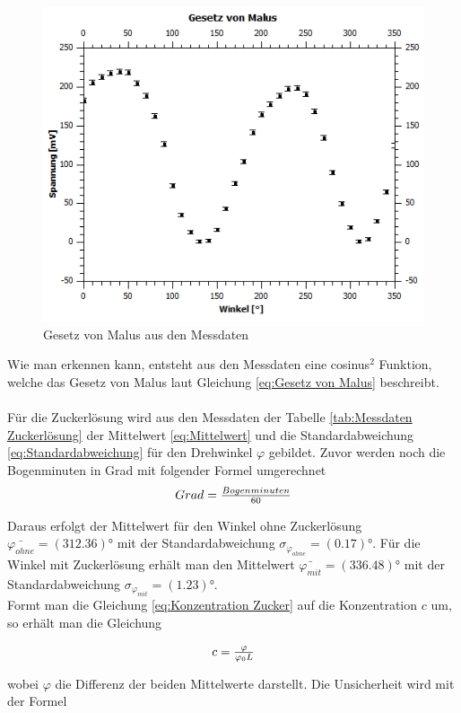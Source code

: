 \documentclass[12pt,a4paper,twoside]{article}
\begin{document}
\begin{figure}[H]
    \centering
    \includegraphics[width=0.6\linewidth]{nudes/malusplot.jpg}
    \caption{Gesetz von Malus aus den Messdaten}
    \label{fig:malus beweis}
\end{figure}

\noindent
Wie man erkennen kann, entsteht aus den Messdaten eine cosinus$^2$ Funktion, welche das Gesetz von Malus laut Gleichung \ref{eq:Gesetz von Malus} beschreibt.  
\\
\\
Für die Zuckerlösung wird aus den Messdaten der Tabelle \ref{tab:Messdaten Zuckerlösung} der Mittelwert \ref{eq:Mittelwert} und die Standardabweichung \ref{eq:Standardabweichung} für den Drehwinkel $\varphi$ gebildet. Zuvor werden noch die Bogenminuten in Grad mit folgender Formel umgerechnet
\begin{equation}
    \label{eq:Bogenminuten umrechnen}
    \centerline{$Grad = \frac{Bogenminuten}{60}$}
\end{equation}

\noindent
Daraus erfolgt der Mittelwert für den Winkel ohne Zuckerlösung $\bar{\varphi_{ohne}} = (312.36)$° mit der Standardabweichung $\sigma_{\varphi_{ohne}} = (0.17)$°. 
Für die Winkel mit Zuckerlösung erhält man den Mittelwert $\bar{\varphi_{mit}} = (336.48)$° mit der Standardabweichung $\sigma_{\varphi_{mit}} = (1.23)$°.
\\
Formt man die Gleichung \ref{eq:Konzentration Zucker} auf die Konzentration $c$ um, so erhält man die Gleichung

\begin{equation}
    \label{eq:Konzentration Zucker umgeformt}
    \centerline{$c = \frac{\varphi}{\varphi_0 L}$}
\end{equation}
 
\noindent
wobei $\varphi$ die Differenz der beiden Mittelwerte darstellt. Die Unsicherheit wird mit der Formel 
\end{document}
